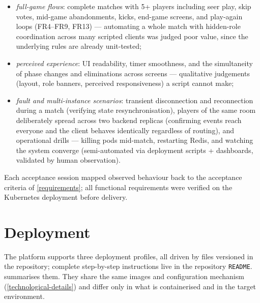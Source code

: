 \documentclass{scrartcl}
\begin{document}
\begin{itemize}
      \item \emph{full-game flows}: complete matches with 5+ players including seer
            play, skip votes, mid-game abandonments, kicks, end-game screens, and
            play-again loops (FR4--FR9, FR13) --- automating a whole match with hidden-role
            coordination across many scripted clients was judged poor value, since the
            underlying rules are already unit-tested;
      \item \emph{perceived experience}: UI readability, timer smoothness, and the
            simultaneity of phase changes and eliminations across screens --- qualitative
            judgements (layout, role banners, perceived responsiveness) a script cannot
            make;
      \item \emph{fault and multi-instance scenarios}: transient disconnection and
            reconnection during a match (verifying state resynchronisation), players of the
            same room deliberately spread across two backend replicas (confirming events
            reach everyone and the client behaves identically regardless of routing), and
            operational drills --- killing pods mid-match, restarting Redis, and watching the
            system converge (semi-automated via deployment scripts + dashboards, validated
            by human observation).
\end{itemize}

Each acceptance session mapped observed behaviour back to the acceptance criteria
of \cref{requirements}; all functional requirements were verified on the
Kubernetes deployment before delivery.

\section{Deployment}\label{deployment}

The platform supports three deployment profiles, all driven by files versioned in
the repository; complete step-by-step instructions live in the repository
\texttt{README}.  summarises them. They share the same images
and configuration mechanism (\cref{technological-details}) and differ only in what
is containerised and in the target environment.
\end{document}
